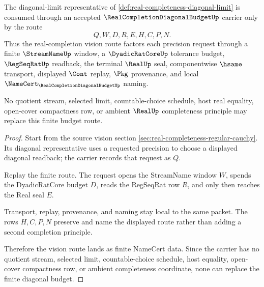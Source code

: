\begin{theorem}
\label{thm:real-completion-diagonal-budget-vision-route}
The diagonal-limit representative of
\autoref{def:real-completeness-diagonal-limit} is consumed through an accepted
$\RealCompletionDiagonalBudgetUp$ carrier only by the route
$$
Q,W,D,R,E,H,C,P,N .
$$
Thus the real-completion vision route factors each precision request through a
finite $\StreamNameUp$ window, a $\DyadicRatCoreUp$ tolerance budget,
$\RegSeqRatUp$ readback, the terminal $\RealUp$ seal, componentwise $\hsame$
transport, displayed $\Cont$ replay, $\Pkg$ provenance, and local
$\NameCert_{\RealCompletionDiagonalBudgetUp}$ naming.

No quotient stream, selected limit, countable-choice schedule, host real
equality, open-cover compactness row, or ambient $\RealUp$ completeness
principle may replace this finite budget route.
\end{theorem}
\begin{proof}
Start from the source vision section
\autoref{sec:real-completeness-regular-cauchy}. Its diagonal representative
uses a requested precision to choose a displayed diagonal readback; the carrier
records that request as $Q$.

Replay the finite route. The request opens the StreamName window $W$, spends
the DyadicRatCore budget $D$, reads the RegSeqRat row $R$, and only then
reaches the Real seal $E$.

Transport, replay, provenance, and naming stay local to the same packet. The
rows $H,C,P,N$ preserve and name the displayed route rather than adding a
second completion principle.

Therefore the vision route lands as finite NameCert data. Since the carrier
has no quotient stream, selected limit, countable-choice schedule, host
equality, open-cover compactness row, or ambient completeness coordinate, none
can replace the finite diagonal budget.
\end{proof}


